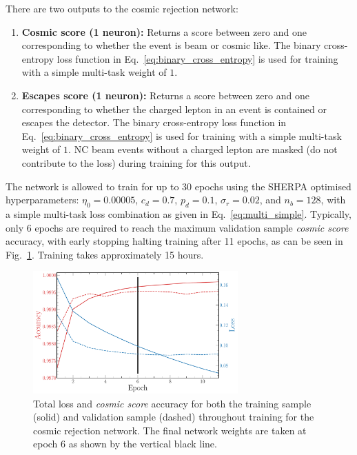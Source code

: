 There are two outputs to the cosmic rejection network:
\begin{enumerate}
    \item \textbf{Cosmic score (1 neuron):} Returns a score between zero and one corresponding to
          whether the event is beam or cosmic like. The binary cross-entropy loss function in
          Eq.~\ref{eq:binary_cross_entropy} is used for training with a simple multi-task weight
          of $1$.
    \item \textbf{Escapes score (1 neuron):} Returns a score between zero and one corresponding to
          whether the charged lepton in an event is contained or escapes the detector. The binary
          cross-entropy loss function in Eq.~\ref{eq:binary_cross_entropy} is used for training
          with a simple multi-task weight of $1$. NC beam events without a charged lepton are
          masked (do not contribute to the loss) during training for this output.
\end{enumerate}

The network is allowed to train for up to 30 epochs using the SHERPA optimised hyperparameters:
$\eta_{0}=0.00005$, $c_{d}=0.7$, $p_{d}=0.1$, $\sigma_{r}=0.02$, and $n_{b}=128$, with a simple
multi-task loss combination as given in Eq.~\ref{eq:multi_simple}. Typically, only 6 epochs are
required to reach the maximum validation sample \emph{cosmic score} accuracy, with early stopping
halting training after 11 epochs, as can be seen in Fig.~\ref{fig:final_cosmic_history}. Training
takes approximately 15 hours.

\begin{figure} %
    \includegraphics[width=0.7\textwidth]{diagrams/7-results/final_cosmic_history.pdf}
    \caption[Loss and accuracy throughout training for the cosmic rejection network]
    {Total loss and \emph{cosmic score} accuracy for both the training sample (solid) and
        validation sample (dashed) throughout training for the cosmic rejection network. The final
        network weights are taken at epoch 6 as shown by the vertical black line.}
    \label{fig:final_cosmic_history}
\end{figure}

